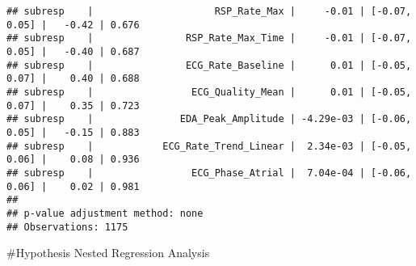 \documentclass[
]{article}
\newenvironment{Shaded}{\begin{snugshade}}{\end{snugshade}}
\newcommand{\CommentTok}[1]{\textcolor[rgb]{0.56,0.35,0.01}{\textit{#1}}}
\newcommand{\DataTypeTok}[1]{\textcolor[rgb]{0.13,0.29,0.53}{#1}}
\newcommand{\DecValTok}[1]{\textcolor[rgb]{0.00,0.00,0.81}{#1}}
\newcommand{\KeywordTok}[1]{\textcolor[rgb]{0.13,0.29,0.53}{\textbf{#1}}}
\newcommand{\NormalTok}[1]{#1}
\newcommand{\OperatorTok}[1]{\textcolor[rgb]{0.81,0.36,0.00}{\textbf{#1}}}
\newcommand{\StringTok}[1]{\textcolor[rgb]{0.31,0.60,0.02}{#1}}
\begin{document}
\begin{verbatim}
## subresp    |                     RSP_Rate_Max |     -0.01 | [-0.07,  0.05] |   -0.42 | 0.676    
## subresp    |                RSP_Rate_Max_Time |     -0.01 | [-0.07,  0.05] |   -0.40 | 0.687    
## subresp    |                ECG_Rate_Baseline |      0.01 | [-0.05,  0.07] |    0.40 | 0.688    
## subresp    |                 ECG_Quality_Mean |      0.01 | [-0.05,  0.07] |    0.35 | 0.723    
## subresp    |               EDA_Peak_Amplitude | -4.29e-03 | [-0.06,  0.05] |   -0.15 | 0.883    
## subresp    |            ECG_Rate_Trend_Linear |  2.34e-03 | [-0.05,  0.06] |    0.08 | 0.936    
## subresp    |                 ECG_Phase_Atrial |  7.04e-04 | [-0.06,  0.06] |    0.02 | 0.981    
## 
## p-value adjustment method: none
## Observations: 1175
\end{verbatim}

\#Hypothesis Nested Regression Analysis

\begin{Shaded}
\end{Shaded}
\end{document}
